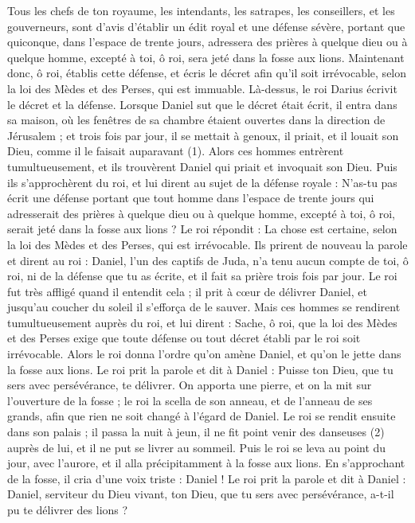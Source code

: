 \begin{multicols}{2}
Tous les chefs de ton royaume, les intendants, les satrapes, les conseillers, et les gouverneurs, sont d'avis d'établir un édit royal et une défense sévère, portant que quiconque, dans l’espace de trente jours, adressera des prières à quelque dieu ou à quelque homme, excepté à toi, ô roi, sera jeté dans la fosse aux lions.
Maintenant donc, ô roi, établis cette défense, et écris le décret afin qu’il soit irrévocable, selon la loi des Mèdes et des Perses, qui est immuable.
Là-dessus, le roi Darius écrivit le décret et la défense.
Lorsque Daniel sut que le décret était écrit, il entra dans sa maison, où les fenêtres de sa chambre étaient ouvertes dans la direction de Jérusalem ; et trois fois par jour, il se mettait à genoux, il priait, et il louait son Dieu, comme il le faisait auparavant (1).
Alors ces hommes entrèrent tumultueusement, et ils trouvèrent Daniel qui priait et invoquait son Dieu.
Puis ils s'approchèrent du roi, et lui dirent au sujet de la défense royale : N'as-tu pas écrit une défense portant que tout homme dans l’espace de trente jours qui adresserait des prières à quelque dieu ou à quelque homme, excepté à toi, ô roi, serait jeté dans la fosse aux lions ? Le roi répondit : La chose est certaine, selon la loi des Mèdes et des Perses, qui est irrévocable.
Ils prirent de nouveau la parole et dirent au roi : Daniel, l’un des captifs de Juda, n'a tenu aucun compte de toi, ô roi,  ni de la défense que tu as écrite, et il fait sa prière trois fois par jour.
Le roi fut très affligé quand il entendit cela ; il prit à cœur de délivrer Daniel, et jusqu’au coucher du soleil il s’efforça de le sauver.
Mais ces hommes se rendirent tumultueusement auprès du roi, et lui dirent : Sache, ô roi, que la loi des Mèdes et des Perses exige que toute défense ou tout décret établi par le roi soit irrévocable.
Alors le roi donna l’ordre qu'on amène Daniel, et qu'on le jette dans la fosse aux lions. Le roi prit la parole et dit à Daniel : Puisse ton Dieu, que tu sers avec persévérance, te délivrer.
On apporta une pierre, et on la mit sur l'ouverture de la fosse ; le roi la scella de son anneau, et de l'anneau de ses grands, afin que rien ne soit changé à l’égard de Daniel.
Le roi se rendit ensuite dans son palais ; il passa la nuit à jeun, il ne fit point venir des danseuses (2) auprès de lui, et il ne put se livrer au sommeil.
Puis le roi se leva au point du jour, avec l’aurore, et il alla précipitamment à la fosse aux lions.
En s’approchant de la fosse, il cria d'une voix triste : Daniel ! Le roi prit la parole et dit à Daniel : Daniel, serviteur du Dieu vivant, ton Dieu, que tu sers avec persévérance, a-t-il pu te délivrer des lions ?

\end{multicols}

